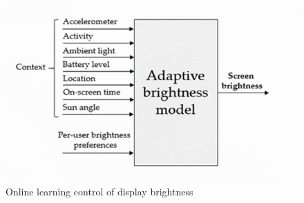 \begin{figure}
    \begin{center}
        \includegraphics[scale=0.35]{Figs/online.png}    
    \end{center}
    \caption{Online learning control of display brightness \cite{6972472}}
    \label{fig:onlinelearning}
\end{figure}

